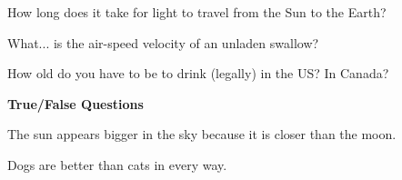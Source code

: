 \documentclass[10pt,addpoints]{exam}
\begin{document}
\begin{questions}
\par\vspace{0.100000in}\begin{minipage}{\linewidth}
\vspace{.35cm}\question[2]
How long does it take for light to travel from the Sun to the Earth?
\vspace{.25cm}\setlength\answerlinelength{1in}
\answerline[8 minutes]
\end{minipage}


\par\vspace{0.100000in}\begin{minipage}{\linewidth}
\vspace{.35cm}\question[2]
What... is the air-speed velocity of an unladen swallow?
\vspace{.25cm}\setlength\answerlinelength{3in}
\end{minipage}


\par\vspace{0.100000in}\begin{minipage}{\linewidth}
\vspace{.35cm}\question[2]
How old do you have to be to drink (legally) in the US?  In Canada?
\vspace{.25cm}\setlength\answerlinelength{1in}
\answerline[21]
\answerline[18]
\end{minipage}





\newpage
\begin{center}
{\Large \textbf{True/False Questions}}
\end{center}

\par\vspace{0.100000in}\begin{minipage}{\linewidth}
\question[1]
The sun appears bigger in the sky because it is closer than the moon.
\setlength\answerlinelength{1in}
\answerline[False]

\medskip
\end{minipage}


\par\vspace{0.100000in}\begin{minipage}{\linewidth}
\question[1]
Dogs are better than cats in every way.
\setlength\answerlinelength{1in}
\answerline[True]


\end{minipage}
\end{questions}
\end{document}
